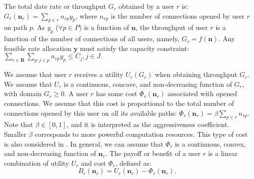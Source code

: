 \documentclass[conference]{IEEEtran}
\begin{document}
The total date rate or throughput $G_r$ obtained by a user $r$ is:
$G_r(\mathbf{n}_r)=\sum_{p\in r} n_{rp} y_p
\label{eqn:throughput}$,
where $n_{rp}$ is the number of connections opened by user $r$ on
path $p$. As  $y_p$ ($\forall p\in P$) is a function of
$\mathbf{n}$, the throughput of user $r$ is a function of the
number of connections of all users, namely, $G_r=f(\mathbf{n})$.
Any feasible rate allocation $\mathbf{y}$ must satisfy the
capacity constraint:
$\sum_{r\in \mathbf{R}} \sum_{p: j\in p} n_{rp} y_p \le C_j, j\in J.$

We assume that user $r$ receives a utility $U_r(G_r)$ when
obtaining throughput $G_r$. We assume that $U_r$ is a continuous,
concave, and non-decreasing function of $G_r$, with domain $G_r
\ge 0$. A user $r$ has some cost $\Phi_r(\mathbf{n}_r)$ associated
with opened connections. We assume that this cost is proportional
to the total number of connections opened by this user on all its
available paths:
$\Phi_r(\mathbf{n}_r) = \beta \sum_{p\in r} n_{rp}.$
Note that $\beta \in [0,1]$, and it is interpreted as the
aggressiveness coefficient. Smaller $\beta$ corresponds to more
powerful computation resources. This type of cost is also
considered in \cite{zhang05tcpgame_icnp}. In general, we can
assume that $\Phi_r$ is a continuous, convex, and non-decreasing
function of $\mathbf{n}_r$.
The payoff or benefit of a user $r$ is a linear combination of
utility $U_r$ and cost $\Phi_r$, defined as:
\begin{equation}
B_r(\mathbf{n}_r)=U_r(\mathbf{n}_r) -
\Phi_r(\mathbf{n}_r).\label{eqn:benefit}
\end{equation}
\end{document}
